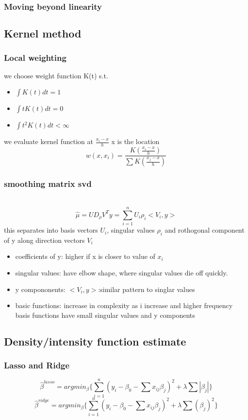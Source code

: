 \documentclass[10pt]{article}
\theoremstyle{break}
\begin{document}
        \subsubsection{Moving beyond linearity}
    \subsection{Kernel method}
        \subsubsection{Local weighting}
            we choose weight function K(t) s.t.
            \begin{itemize}
                \item $\int K(t)dt=1$
                \item $\int tK(t)dt=0$
                \item $\int t^2K(t)dt<\infty$
            \end{itemize}
            we evaluate kernel function at $\frac{x_i-x}{h}$
            x is the location
            $$w(x,x_i)=\frac{K(\frac{x_i-x}{h})}{\sum K(\frac{x_j-x}{h})}$$
        \subsubsection{smoothing matrix svd}\
            $$\hat{\mu}=UD_\rho V^Ty=\sum_{i=1}^nU_i\rho _i<V_i,y>$$
            this separates into basis vectors $U_i$, singular values $\rho_i$ and 
            rothogonal component of y along direction vectors $V_i$
            \begin{itemize}
                \item coefficients of y: higher if x is closer to value of $x_i$
                \item singular values: have elbow shape, where singular values die off quickly.
                \item y compononents: $<V_i,y>$:similar pattern to singlar values 
                \item basic functions: increase in complexity as i increase and higher frequency basis functions have small singular values and y components
            \end{itemize}
    \subsection{Density/intensity function estimate}
        \subsubsection{Lasso and Ridge}
            $$\hat{\beta}^{lasso}=argmin_\beta\{\sum_{i=1}^n(y_i-\beta_0-\sum x_{ij}\beta_j)^2+\lambda\sum|\beta_j|\}$$
            $$\hat{\beta}^{ridge}=argmin_\beta\{\sum_{i=1}^n(y_i-\beta_0-\sum x_{ij}\beta_j)^2+\lambda\sum(\beta_j)^2\}$$
\end{document}
